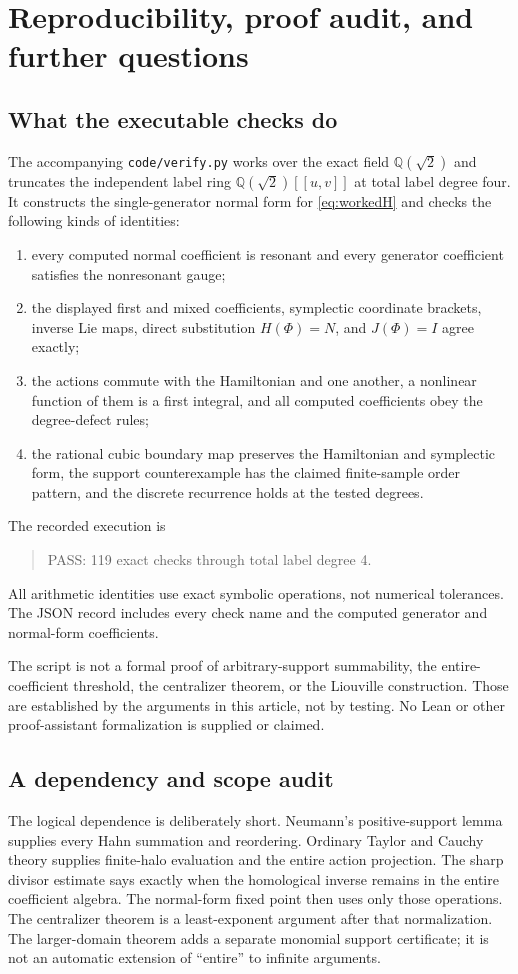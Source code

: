 \documentclass[11pt,letterpaper]{article}
\numberwithin{equation}{section}
\theoremstyle{definition}
\theoremstyle{remark}
\newcommand{\Q}{\mathbb Q}
\begin{document}
\section{Reproducibility, proof audit, and further questions}
\label{sec:verification}

\subsection{What the executable checks do}
The accompanying \texttt{code/verify.py} works over the exact field
$\Q(\sqrt2)$ and truncates the independent label ring $\Q(\sqrt2)[[u,v]]$
at total label degree four. It constructs the single-generator normal form
for \eqref{eq:workedH} and checks the following kinds of identities:
\begin{enumerate}[label=(\roman*)]
\item every computed normal coefficient is resonant and every generator
coefficient satisfies the nonresonant gauge;
\item the displayed first and mixed coefficients, symplectic coordinate
brackets, inverse Lie maps, direct substitution $H(\Phi)=N$, and
$J(\Phi)=I$ agree exactly;
\item the actions commute with the Hamiltonian and one another, a nonlinear
function of them is a first integral, and all computed coefficients obey
the degree-defect rules;
\item the rational cubic boundary map preserves the Hamiltonian and
symplectic form, the support counterexample has the claimed finite-sample
order pattern, and the discrete recurrence holds at the tested degrees.
\end{enumerate}
The recorded execution is
\begin{quote}\ttfamily
PASS: 119 exact checks through total label degree 4.
\end{quote}
All arithmetic identities use exact symbolic operations, not numerical
tolerances. The JSON record includes every check name and the computed
generator and normal-form coefficients.

The script is not a formal proof of arbitrary-support summability, the
entire-coefficient threshold, the centralizer theorem, or the Liouville
construction. Those are established by the arguments in this article, not
by testing. No Lean or other proof-assistant formalization is supplied or
claimed.

\subsection{A dependency and scope audit}
The logical dependence is deliberately short. Neumann's positive-support
lemma supplies every Hahn summation and reordering. Ordinary Taylor and
Cauchy theory supplies finite-halo evaluation and the entire action
projection. The sharp divisor estimate says exactly when the homological
inverse remains in the entire coefficient algebra. The normal-form fixed
point then uses only those operations. The centralizer theorem is a
least-exponent argument after that normalization. The larger-domain theorem
adds a separate monomial support certificate; it is not an automatic
extension of ``entire'' to infinite arguments.
\end{document}
